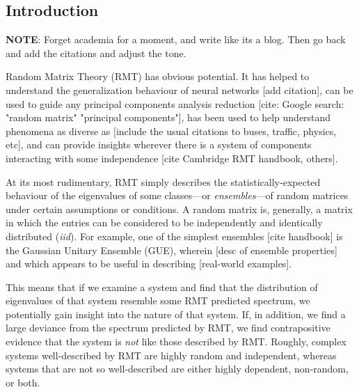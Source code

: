 \documentclass[12pt]{spieman}  %
\begin{document}
\begin{spacing}{2}   %

\section{Introduction}
\label{sect:intro}  %

\textbf{NOTE}: Forget academia for a moment, and write like its a blog. Then go
back and add the citations and adjust the tone.

Random Matrix Theory (RMT) has obvious potential. It has helped to understand
the generalization behaviour of neural networks [add citation], can be used to
guide any principal components analysis reduction [cite: Google search: "random
matrix" "principal components"], has been used to help understand phenomena as
diverse as [include the usual citations to buses, traffic, physics, etc], and
can provide insights wherever there is a system of components interacting with
some independence [cite Cambridge RMT handbook, others].

At its most rudimentary, RMT simply describes the statistically-expected
behaviour of the eigenvalues of some classes—or \textit{ensembles}—of random
matrices under certain assumptions or conditions. A random matrix is,
generally, a matrix in which the entries can be considered to be independently
and identically distributed (\textit{iid}). For example, one of the simplest
ensembles [cite handbook] is the Gaussian Unitary Ensemble (GUE), wherein [desc
of ensemble properties] and which appears to be useful in describing
[real-world examples].

This means that if we examine a system and find that the distribution of
eigenvalues of that system resemble some RMT predicted spectrum, we potentially
gain insight into the nature of that system. If, in addition, we find a large
deviance from the spectrum predicted by RMT, we find contrapositive evidence
that the system is \textit{not} like those described by RMT. Roughly, complex
systems well-described by RMT are highly random and independent, whereas
systems that are not so well-described are either highly dependent, non-random,
or both.


\end{spacing}
\end{document}
